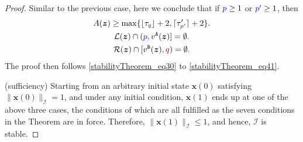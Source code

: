 \documentclass[10 pt,twocolumn,journal]{IEEEtran}
\DeclarePairedDelimiter{\ceil}{\lceil}{\rceil}
\DeclarePairedDelimiter{\floor}{\lfloor}{\rfloor}
\theoremstyle{plain}
\newcommand{\A}{\mathcal{A}}
\newcommand{\I}{\mathcal{I}}
\newcommand{\X}{\mathcal{X}}
\newcommand{\R}{\mathcal{R}}
\renewcommand{\L}{\mathcal{L}}
\newcommand{\x}{\bm{x}}
\newcommand{\z}{\bm{z}}
\newcommand{\p}{\tb{p}}
\newcommand{\pp}{\tb{p'}}
\newcommand{\q}{\tr{q}}
\newcommand{\qq}{\tr{q'}}
\renewcommand{\A}{\mathtt{A}}
\newcommand{\B}{\mathtt{B}}
\newcommand{\tb}{\textcolor{blue}}
\newcommand{\tr}{\textcolor{Myred}}
\theoremstyle{definition}
\begin{document}
\begin{proof}
Similar to the previous case, here we conclude that
if $\p\geq 1$ or $\pp\geq 1$, then
\begin{gather}    %
    A(\z) \geq \max\{\floor{\tau_{\q}}+2,\ceil{\tau'_{\pp }}+2\}. \label{stabilityTheorem_eq39} \\
    \L(\z)\cap(\p,v^{\A}(\z)] = \emptyset.\label{stabilityTheorem_eq40} \\
    \R(\z)\cap[v^{\B}(\z),\q) = \emptyset.\label{stabilityTheorem_eq41} 
\end{gather}
The proof then follows \eqref{stabilityTheorem_eq30} to
\eqref{stabilityTheorem_eq41}.

(sufficiency) Starting from an arbitrary initial state $\x(0)$ satisfying $\|\x(0)\|_{\I} = 1$, and under any initial condition, $\x(1)$ ends up at one of the above three cases, the conditions of which are all fulfilled as the seven conditions in the Theorem are in force. 
Therefore, $\|\x(1)\|_{\I}\leq 1$, and hence, $\I$ is stable.
\end{proof}

\end{document}
